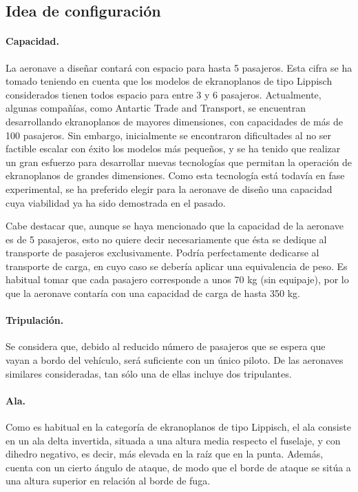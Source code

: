 \FloatBarrier

\subsection{Idea de configuración}
\label{sec:design:config}

\paragraph{Capacidad.} La aeronave a diseñar contará con espacio para hasta 5 pasajeros. Esta cifra se ha tomado teniendo en cuenta que los modelos de ekranoplanos de tipo Lippisch considerados tienen todos espacio para entre 3 y 6 pasajeros. Actualmente, algunas compañías, como Antartic Trade and Transport, se encuentran desarrollando ekranoplanos de mayores dimensiones, con capacidades de más de 100 pasajeros. Sin embargo, inicialmente se encontraron dificultades al no ser factible escalar con éxito los modelos más pequeños, y se ha tenido que realizar un gran esfuerzo para desarrollar nuevas tecnologías que permitan la operación de ekranoplanos de grandes dimensiones. Como esta tecnología está todavía en fase experimental, se ha preferido elegir para la aeronave de diseño una capacidad cuya viabilidad ya ha sido demostrada en el pasado.

Cabe destacar que, aunque se haya mencionado que la capacidad de la aeronave es de 5 pasajeros, esto no quiere decir necesariamente que ésta se dedique al transporte de pasajeros exclusivamente. Podría perfectamente dedicarse al transporte de carga, en cuyo caso se debería aplicar una equivalencia de peso. Es habitual tomar que cada pasajero corresponde a unos 70 kg (sin equipaje), por lo que la aeronave contaría con una capacidad de carga de hasta 350 kg.

\paragraph{Tripulación.} Se considera que, debido al reducido número de pasajeros que se espera que vayan a bordo del vehículo, será suficiente con un único piloto. De las aeronaves similares consideradas, tan sólo una de ellas incluye dos tripulantes.

\paragraph{Ala.} Como es habitual en la categoría de ekranoplanos de tipo Lippisch, el ala consiste en un ala delta invertida, situada a una altura media respecto el fuselaje, y con dihedro negativo, es decir, más elevada en la raíz que en la punta. Además, cuenta con un cierto ángulo de ataque, de modo que el borde de ataque se sitúa a una altura superior en relación al borde de fuga.

